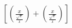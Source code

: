 \documentclass{article}
\begin{document}
\begin{align*}
\left[
  \left( 
	  \frac{x}{\frac{\sqrt{x}}{x}}
  \right)
  +
  \left( 
	  \frac{x}{\frac{\sqrt{x}}{x}}
  \right)
\right]
\end{align*}
\end{document}
